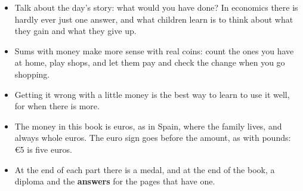 {\small
\begin{itemize}[leftmargin=6mm, itemsep=1pt, topsep=2pt]
\item Talk about the day's story: what would you have done? In
  economics there is hardly ever just one answer, and what children
  learn is to think about what they gain and what they give up.
\item Sums with money make more sense with real coins: count the ones
  you have at home, play shops, and let them pay and check the change
  when you go shopping.
\item Getting it wrong with a little money is the best way to learn to
  use it well, for when there is more.
\item The money in this book is euros, as in Spain, where the family
  lives, and always whole euros. The euro sign goes before the amount,
  as with pounds: €5 is five euros.
\item At the end of each part there is a medal, and at the end of the
  book, a diploma and the \textbf{answers} for the pages that have one.
\end{itemize}}
\newpage
